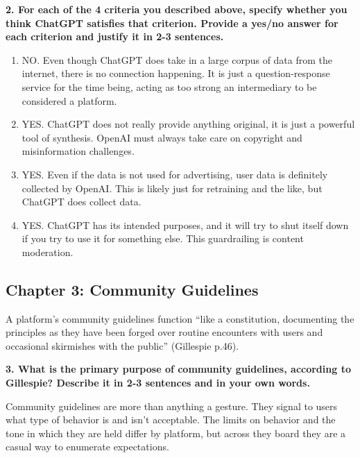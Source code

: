 \documentclass{article}
\begin{document}
\textbf{2. For each of the 4 criteria you described above, specify whether you think ChatGPT satisfies that criterion. Provide a yes/no answer for each criterion and justify it in 2-3 sentences.}

\bigskip

\begin{mdframed}

\begin{enumerate}
    \item NO. Even though ChatGPT does take in a large corpus of data from the internet, there is no connection happening. It is just a question-response service for the time being, acting as too strong an intermediary to be considered a platform. 
    \item YES. ChatGPT does not really provide anything original, it is just a powerful tool of synthesis. OpenAI must always take care on copyright and misinformation challenges.
    \item YES. Even if the data is not used for advertising, user data is definitely collected by OpenAI. This is likely just for retraining and the like, but ChatGPT does collect data. 
    \item YES. ChatGPT has its intended purposes, and it will try to shut itself down if you try to use it for something else. This guardrailing is content moderation.  
\end{enumerate}
\end{mdframed}

\bigskip

\subsection*{Chapter 3: Community Guidelines}

A platform's community guidelines function ``like a constitution, documenting the principles as they have been forged over routine encounters with users and occasional skirmishes with the public'' (Gillespie p.46).

\textbf{3. What is the primary purpose of community guidelines, according to Gillespie? Describe it in 2-3 sentences and in your own words.}
\bigskip
\begin{mdframed}
Community guidelines are more than anything a gesture. They signal to users what type of behavior is and isn't acceptable. The limits on behavior and the tone in which they are held differ by platform, but across they board they are a casual way to enumerate expectations. 
\end{mdframed}
\bigskip
\end{document}

